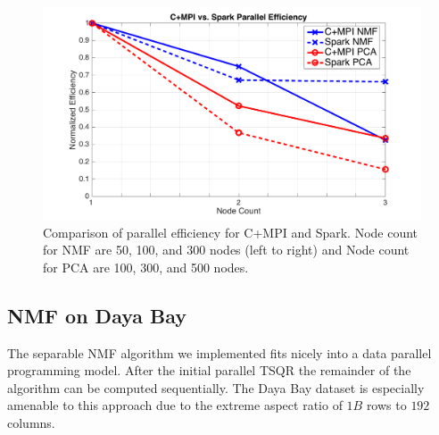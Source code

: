 \begin{figure}[t]
\includegraphics[width=.5\textwidth]{fig/peff.png}
\caption{Comparison of parallel efficiency for C+MPI and Spark. Node count for NMF are 50, 100, and 300 nodes (left to right) and Node count for PCA are 100, 300, and 500 nodes.}
\label{fig:peff}
\end{figure}

\subsection{NMF on Daya Bay}
The separable NMF algorithm we implemented fits nicely into a data parallel programming model. After the initial parallel TSQR the remainder of the algorithm can be computed sequentially. The Daya Bay dataset is especially amenable to this approach due to the extreme aspect ratio of $1B$ rows to $192$ columns.
